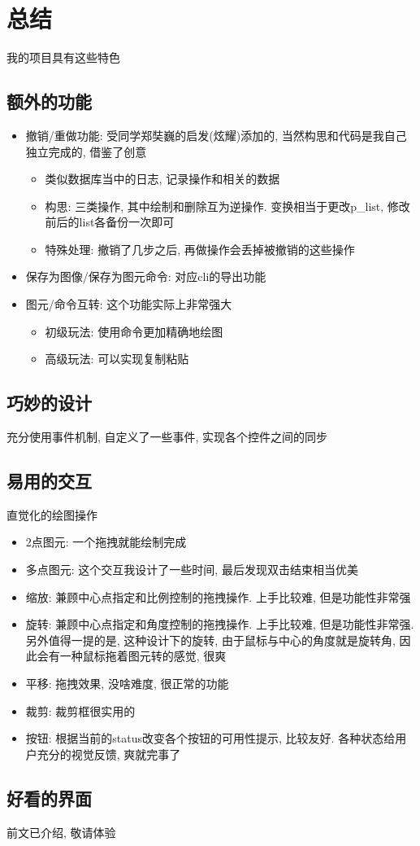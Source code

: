 \documentclass[a4paper,UTF8]{article}
\theoremstyle{definition}
\begin{document}
\section{总结}
我的项目具有这些特色
\subsection{额外的功能}
\begin{itemize}
    \item 撤销/重做功能: 受同学郑奘巍的启发(炫耀)添加的, 当然构思和代码是我自己独立完成的, 借鉴了创意\begin{itemize}
      \item 类似数据库当中的日志, 记录操作和相关的数据
      \item 构思: 三类操作, 其中绘制和删除互为逆操作. 变换相当于更改p\_list, 修改前后的list各备份一次即可
      \item 特殊处理: 撤销了几步之后, 再做操作会丢掉被撤销的这些操作
    \end{itemize}
    \item 保存为图像/保存为图元命令: 对应cli的导出功能
    \item 图元/命令互转: 这个功能实际上非常强大\begin{itemize}
      \item 初级玩法: 使用命令更加精确地绘图
      \item 高级玩法: 可以实现复制粘贴
    \end{itemize}
  \end{itemize}
  \subsection{巧妙的设计}
  充分使用事件机制, 自定义了一些事件, 实现各个控件之间的同步
  \subsection{易用的交互}
  直觉化的绘图操作\begin{itemize}
    \item 2点图元: 一个拖拽就能绘制完成
    \item 多点图元: 这个交互我设计了一些时间, 最后发现双击结束相当优美
    \item 缩放: 兼顾中心点指定和比例控制的拖拽操作. 上手比较难, 但是功能性非常强
    \item 旋转: 兼顾中心点指定和角度控制的拖拽操作. 上手比较难, 但是功能性非常强. 另外值得一提的是, 这种设计下的旋转, 由于鼠标与中心的角度就是旋转角, 因此会有一种鼠标拖着图元转的感觉, 很爽
    \item 平移: 拖拽效果, 没啥难度, 很正常的功能
    \item 裁剪: 裁剪框很实用的
    \item 按钮: 根据当前的status改变各个按钮的可用性提示, 比较友好. 各种状态给用户充分的视觉反馈, 爽就完事了
  \end{itemize}
\subsection{好看的界面}
前文已介绍, 敬请体验

%

\end{document}
